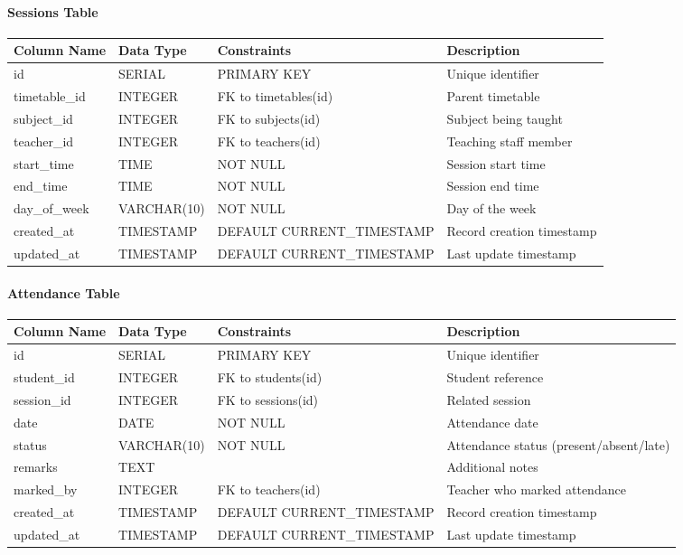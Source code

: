 \documentclass[12pt,a4paper]{report}
\begin{document}
\paragraph{Sessions Table}
\begin{longtable}{|p{3cm}|p{3cm}|p{2cm}|p{6cm}|}
\hline
\textbf{Column Name} & \textbf{Data Type} & \textbf{Constraints} & \textbf{Description} \\
\hline
\endhead
id & SERIAL & PRIMARY KEY & Unique identifier \\
\hline
timetable\_id & INTEGER & FK to timetables(id) & Parent timetable \\
\hline
subject\_id & INTEGER & FK to subjects(id) & Subject being taught \\
\hline
teacher\_id & INTEGER & FK to teachers(id) & Teaching staff member \\
\hline
start\_time & TIME & NOT NULL & Session start time \\
\hline
end\_time & TIME & NOT NULL & Session end time \\
\hline
day\_of\_week & VARCHAR(10) & NOT NULL & Day of the week \\
\hline
created\_at & TIMESTAMP & DEFAULT CURRENT\_TIMESTAMP & Record creation timestamp \\
\hline
updated\_at & TIMESTAMP & DEFAULT CURRENT\_TIMESTAMP & Last update timestamp \\
\hline
\end{longtable}

\paragraph{Attendance Table}
\begin{longtable}{|p{3cm}|p{3cm}|p{2cm}|p{6cm}|}
\hline
\textbf{Column Name} & \textbf{Data Type} & \textbf{Constraints} & \textbf{Description} \\
\hline
\endhead
id & SERIAL & PRIMARY KEY & Unique identifier \\
\hline
student\_id & INTEGER & FK to students(id) & Student reference \\
\hline
session\_id & INTEGER & FK to sessions(id) & Related session \\
\hline
date & DATE & NOT NULL & Attendance date \\
\hline
status & VARCHAR(10) & NOT NULL & Attendance status (present/absent/late) \\
\hline
remarks & TEXT & & Additional notes \\
\hline
marked\_by & INTEGER & FK to teachers(id) & Teacher who marked attendance \\
\hline
created\_at & TIMESTAMP & DEFAULT CURRENT\_TIMESTAMP & Record creation timestamp \\
\hline
updated\_at & TIMESTAMP & DEFAULT CURRENT\_TIMESTAMP & Last update timestamp \\
\hline
\end{longtable}
\end{document}
